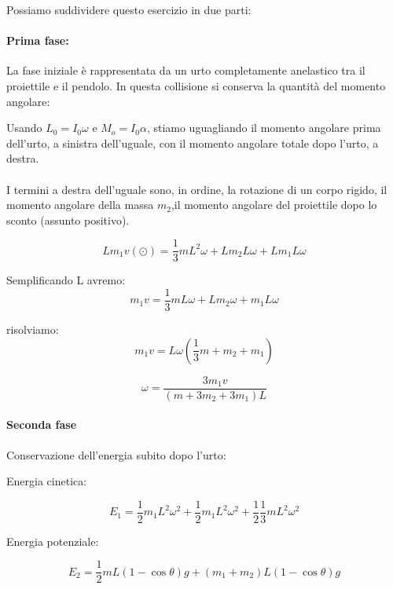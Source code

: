 Possiamo suddividere questo esercizio in due parti:
\paragraph{Prima fase:}
La fase iniziale è rappresentata da un urto completamente anelastico tra il proiettile e il pendolo. In questa collisione si conserva la quantità del momento angolare:

Usando $L_0 = I_0\omega$ e $M_o = I_0\alpha$, stiamo uguagliando il momento angolare prima dell'urto, a sinistra dell'uguale, con il momento angolare totale dopo l'urto, a destra.
\paragraph{}
I termini a destra dell'uguale sono, in ordine, la rotazione di un corpo rigido, il momento angolare della massa $m_2$,il momento angolare del proiettile dopo lo sconto (assunto positivo).

\begin{equation*}
    Lm_1v (\odot) = \frac{1}{3}mL^2 \omega + Lm_2L\omega + Lm_1L\omega
\end{equation*}


Semplificando L avremo:
\begin{equation*}
    m_1v  = \frac{1}{3}mL \omega + Lm_2\omega + m_1L\omega
\end{equation*}

risolviamo:
\begin{equation*}
    m_1v= L\omega (\frac{1}{3}m + m_2 + m_1)
\end{equation*}

\begin{equation}
    \omega = \frac{3m_1v}{(m+3m_2+3m_1)L}
\end{equation}


\paragraph{Seconda fase}
Conservazione dell'energia subito dopo l'urto:

Energia cinetica:

\begin{equation} 
    E_1 = \frac{1}{2}m_1L^2\omega^2 + \frac{1}{2}m_1L^2\omega^2 +\frac{1}{2}\frac{1}{3}mL^2\omega^2
\end{equation}

Energia potenziale:

\begin{equation} 
    E_2 = \frac{1}{2}mL(1-\cos\theta)g + (m_1+m_2)L(1-\cos\theta)g
\end{equation}

